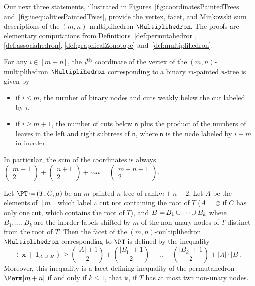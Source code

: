 \documentclass[AHL,Unicode,longabstracts,published]{cedram}
\renewcommand{\b}[1]{\boldsymbol{#1}}
\newcommand{\dotprod}[2]{\left\langle \, #1 \; \middle| \; #2 \, \right\rangle}
\newcommand{\one}{\b{1}}
\newcommand{\eqdef}{\mbox{\,\raisebox{0.2ex}{\scriptsize\ensuremath{\mathrm:}}\ensuremath{=}\,}}
\newcommand{\node}[1]{\mathsf{#1}}
\begin{document}
Our next three statements, illustrated in Figures~\ref{fig:coordinatesPaintedTrees} and~\ref{fig:inequalitiesPaintedTrees}, provide the vertex, facet, and Minkowski sum descriptions of the $(m,n)$-multi\-plihedron $\Multiplihedron$. The proofs are elementary computations from Definitions~\ref{def:permutahedron}, \ref{def:associahedron}, \ref{def:graphicalZonotope} and~\ref{def:multiplihedron}.

\begin{prop}\label{prop:verticesMultiplihedron}
For any $i \in [m+n]$, the $i^{\rm th}$ coordinate of the vertex of the $(m,n)$-multiplihedron $\Multiplihedron$ corresponding to a binary $m$-painted $n$-tree is given by
\begin{itemize}
\item if $i \le m$, the number of binary nodes and cuts weakly below the cut labeled by $i$,
\item if $i \ge m+1$, the number of cuts below $\node{n}$ plus the product of the numbers of leaves in the left and right subtrees of $\node{n}$, where $\node{n}$ is the node labeled by $i-m$ in inorder.
\end{itemize}
In particular, the sum of the coordinates is always
$(\begin{smallmatrix}
m+1\\2
\end{smallmatrix}) + (\begin{smallmatrix}
n+1\\
2\end{smallmatrix}) + mn = (\begin{smallmatrix}m+n+1\\
2\end{smallmatrix})$.
\end{prop}

\begin{prop}\label{prop:facetsMultiplihedron}
Let $\PT \eqdef (T, C, \mu)$ be an $m$-painted $n$-tree of rank\linebreak${m+n -2}$. Let $A$ be the elements of $[m]$ which label a cut not containing the root of $T$ (${A = \varnothing}$ if $C$ has only one cut, which contains the root of $T$), and $B \eqdef B_1 \cup \dots \cup B_k$ where $B_1, \dots, B_k$ are the inorder labels shifted by $m$ of the non-unary nodes of $T$ distinct from the root of $T$. Then the facet of the $(m,n)$-multiplihedron $\Multiplihedron$ corresponding to $\PT$ is defined by the inequality
\[
\textstyle{\dotprod{\b{x}}{\one_{A\,\cup\,B}} \ge \binom{|A|+1}{2} + \binom{|B_1|+1}{2} + \dots + \binom{|B_k|+1}{2} + |A| \cdot |B|.}
\]
Moreover, this inequality is a facet defining inequality of the permutahedron\linebreak${\Perm[m+n]}$ if and only if $k \le 1$, that is, if $T$ has at most two non-unary nodes.
\end{prop}
\end{document}
